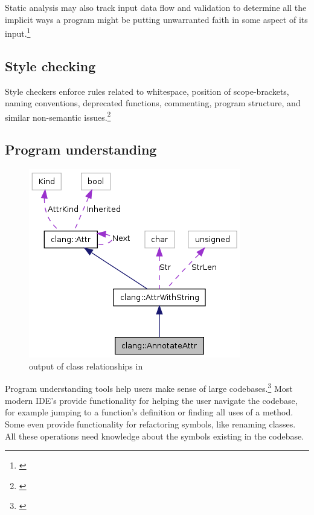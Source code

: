 Static analysis may also track input data flow and validation to determine
all the implicit ways a program might be putting unwarranted faith in some aspect of its input.\footnote{\citep[172]{SecureProgramming}}

\subsection{Style checking}

Style checkers enforce rules related to whitespace, position of scope-brackets, naming conventions, deprecated functions, commenting, program structure, and similar non-semantic issues.\footnote{\citep[25]{SecureProgramming}}

\subsection{Program understanding}

\begin{figure}
  \vspace{-20pt}
  \begin{center}
    \includegraphics[scale=0.5]{Images/ClangGraph.png}
  \end{center}
  \caption{ output of class relationships in }
  \label{fig:ClangGraph}
   \vspace{-15pt}
\end{figure}

Program understanding tools help users make sense of large codebases.\footnote{\citep[27]{SecureProgramming}} Most modern IDE's provide functionality for helping the user navigate the codebase, for example jumping to a function's definition or finding all uses of a method. Some even provide functionality for refactoring symbols, like renaming classes. All these operations need knowledge about the symbols existing in the codebase.

